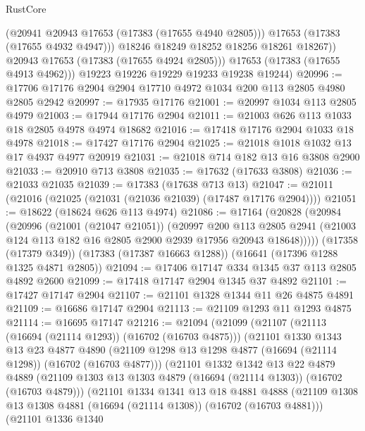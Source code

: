 \begin{lexlean}{RustCore}
\begin{coremodule}
                (@20941 @20943 @17653 (@17383 (@17655 @4940 @2805)))
                @17653
                (@17383 (@17655 @4932 @4947)))
              @18246
              @18249
              @18252
              @18256
              @18261
              @18267))
          @20943
          @17653
          (@17383 (@17655 @4924 @2805)))
        @17653
        (@17383 (@17655 @4913 @4962)))
      @19223
      @19226
      @19229
      @19233
      @19238
      @19244)
@20996 := @17706 @17176 @2904 @2904 @17710 @4972 @1034 @200 @113 @2805 @4980 @2805 @2942
@20997 := @17935 @17176
@21001 := @20997 @1034 @113 @2805 @4979
@21003 := @17944 @17176 @2904
@21011 := @21003 @626 @113 @1033 @18 @2805 @4978 @4974 @18682
@21016 := @17418 @17176 @2904 @1033 @18 @4978
@21018 := @17427 @17176 @2904
@21025 := @21018 @1018 @1032 @13 @17 @4937 @4977 @20919
@21031 := @21018 @714 @182 @13 @16 @3808 @2900
@21033 := @20910 @713 @3808
@21035 := @17632 (@17633 @3808)
@21036 := @21033 @21035
@21039 := @17383 (@17638 @713 @13)
@21047 := @21011 (@21016 (@21025 (@21031 (@21036 @21039) (@17487 @17176 @2904))))
@21051 := @18622 (@18624 @626 @113 @4974)
@21086 := @17164
    (@20828
      (@20984
        (@20996
          (@21001 (@21047 @21051))
          (@20997
            @200
            @113
            @2805
            @2941
            (@21003 @124 @113 @182 @16 @2805 @2900 @2939 @17956 @20943 @18648)))))
    (@17358 (@17379 @349))
    (@17383 (@17387 @16663 @1288))
    (@16641 (@17396 @1288 @1325 @4871 @2805))
@21094 := @17406 @17147 @334 @1345 @37 @113 @2805 @4892 @2600
@21099 := @17418 @17147 @2904 @1345 @37 @4892
@21101 := @17427 @17147 @2904
@21107 := @21101 @1328 @1344 @11 @26 @4875 @4891
@21109 := @16686 @17147 @2904
@21113 := @21109 @1293 @11 @1293 @4875
@21114 := @16695 @17147
@21216 := @21094
    (@21099
      (@21107
        (@21113 (@16694 (@21114 @1293)) (@16702 (@16703 @4875)))
        (@21101
          @1330
          @1343
          @13
          @23
          @4877
          @4890
          (@21109 @1298 @13 @1298 @4877 (@16694 (@21114 @1298)) (@16702 (@16703 @4877)))
          (@21101
            @1332
            @1342
            @13
            @22
            @4879
            @4889
            (@21109 @1303 @13 @1303 @4879 (@16694 (@21114 @1303)) (@16702 (@16703 @4879)))
            (@21101
              @1334
              @1341
              @13
              @18
              @4881
              @4888
              (@21109 @1308 @13 @1308 @4881 (@16694 (@21114 @1308)) (@16702 (@16703 @4881)))
              (@21101
                @1336
                @1340

\end{coremodule}
\end{lexlean}

